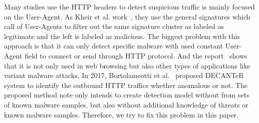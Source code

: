 Many studies use the HTTP headers to detect suspicious traffic is mainly focused on the User-Agent. As Kheir et al. work~\cite{kheir2013behavioral}, they use the general signatures which call of User-Agents to filter out the same signature cluster as labeled as legitimate and the left is labeled as malicious. The biggest problem with this approach is that it can only detect specific malware with used constant User-Agent field to connect or send through HTTP protocol. And the report~\cite{bartos2016optimized} shows that it is not only used in web browsing but also other types of applications like variant malware attacks. In 2017, Bortolameotti et al.~\cite{bortolameotti2017decanter} proposed DECANTeR system to identify the outbound HTTP traffics whether anomalous or not.   The proposed method note only intends to create detection model without from sets of known malware samples, but also without additional knowledge of threats or known malware samples. Therefore, we try to fix this problem in this paper. 